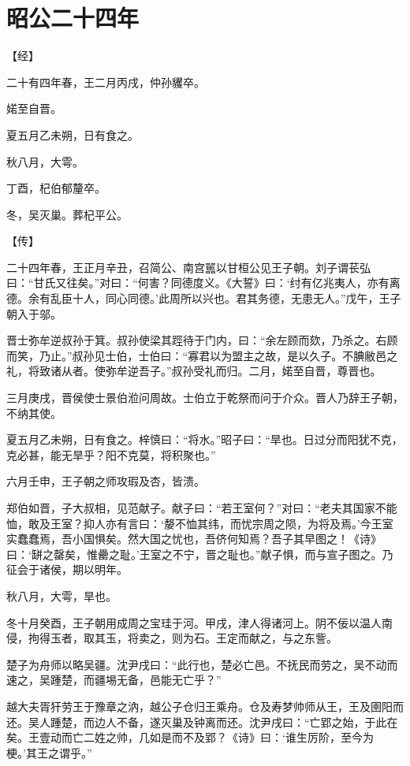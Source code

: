 \documentclass[a4paper,12pt,UTF8,twoside]{ctexbook}
\begin{document}
\chapter{昭公二十四年}



【经】

二十有四年春，王二月丙戌，仲孙貜卒。

婼至自晋。

夏五月乙未朔，日有食之。

秋八月，大雩。

丁酉，杞伯郁釐卒。

冬，吴灭巢。葬杞平公。

【传】

二十四年春，王正月辛丑，召简公、南宫嚚以甘桓公见王子朝。刘子谓苌弘曰：“甘氏又往矣。”对曰：“何害？同德度义。《大誓》曰：‘纣有亿兆夷人，亦有离德。余有乱臣十人，同心同德。’此周所以兴也。君其务德，无患无人。”戊午，王子朝入于邬。

晋士弥牟逆叔孙于箕。叔孙使梁其踁待于门内，曰：“余左顾而欬，乃杀之。右顾而笑，乃止。”叔孙见士伯，士伯曰：“寡君以为盟主之故，是以久子。不腆敝邑之礼，将致诸从者。使弥牟逆吾子。”叔孙受礼而归。二月，婼至自晋，尊晋也。

三月庚戌，晋侯使士景伯涖问周故。士伯立于乾祭而问于介众。晋人乃辞王子朝，不纳其使。

夏五月乙未朔，日有食之。梓慎曰：“将水。”昭子曰：“旱也。日过分而阳犹不克，克必甚，能无旱乎？阳不克莫，将积聚也。”

六月壬申，王子朝之师攻瑕及杏，皆溃。

郑伯如晋，子大叔相，见范献子。献子曰：“若王室何？”对曰：“老夫其国家不能恤，敢及王室？抑人亦有言曰：‘嫠不恤其纬，而忧宗周之陨，为将及焉。’今王室实蠢蠢焉，吾小国惧矣。然大国之忧也，吾侪何知焉？吾子其早图之！《诗》曰：‘缾之罄矣，惟罍之耻。’王室之不宁，晋之耻也。”献子惧，而与宣子图之。乃征会于诸侯，期以明年。

秋八月，大雩，旱也。

冬十月癸酉，王子朝用成周之宝珪于河。甲戌，津人得诸河上。阴不佞以温人南侵，拘得玉者，取其玉，将卖之，则为石。王定而献之，与之东訾。

楚子为舟师以略吴疆。沈尹戌曰：“此行也，楚必亡邑。不抚民而劳之，吴不动而速之，吴踵楚，而疆埸无备，邑能无亡乎？”

越大夫胥犴劳王于豫章之汭，越公子仓归王乘舟。仓及寿梦帅师从王，王及圉阳而还。吴人踵楚，而边人不备，遂灭巢及钟离而还。沈尹戌曰：“亡郢之始，于此在矣。王壹动而亡二姓之帅，几如是而不及郢？《诗》曰：‘谁生厉阶，至今为梗。’其王之谓乎。”
\end{document}
